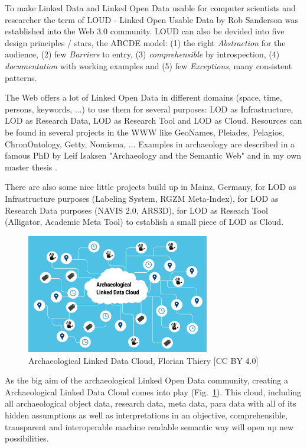 \documentclass[twocolumn]{autart}
\begin{document}
To make Linked Data and Linked Open Data usable for computer scientists and researcher the term of LOUD - Linked Open Usable Data \cite{sanderson_loud} by Rob Sanderson was established into the Web 3.0 community. LOUD can also be devided into five design principles / stars, the ABCDE model: (1) the right \textit{Abstraction} for the audience, (2) few \textit{Barriers} to entry, (3) \textit{comprehensible} by introspection, (4) \textit{documentation} with working examples and (5) few \textit{Exceptions}, many consistent patterns.

The Web offers a lot of Linked Open Data in different domains (space, time, persons, keywords, ...) to use them for several purposes: LOD as Infrastructure, LOD as Research Data, LOD as Research Tool and LOD as Cloud. Resources can be found in several projects in the WWW like GeoNames, Pleiades, Pelagios, ChronOntology, Getty, Nomisma, ... Examples in archaeology are described in a famous PhD by Leif Isaksen "Archaeology and the Semantic Web" \cite{isaksen_archaeology} and in my own master thesis \cite{thiery_geinarfa}.

There are also some nice little projects build up in Mainz, Germany, for LOD as Infrastructure purposes (Labeling System, RGZM Meta-Index), for LOD as Research Data purposes (NAVIS 2.0, ARS3D), for LOD as Reseach Tool (Alligator, Academic Meta Tool) to establish a small piece of LOD as Cloud.

\begin{figure}[!htb]
\begin{center}
\includegraphics[width=8cm]{Archaeological_Linked_Data_Cloud_(ALDC).png}
\caption{Archaeological Linked Data Cloud, Florian Thiery [CC BY 4.0]}
\label{figaaldc}
\end{center}
\end{figure}

As the big aim of the archaeological Linked Open Data community, creating a Archaeological Linked Data Cloud comes into play (Fig.~\ref{figaaldc}). This cloud, including all archaeological object data, research data, meta data, para data with all of its hidden assumptions as well as interpretations in an objective, comprehensible, transparent and interoperable machine readable semantic way will open up new possibilities.
\end{document}
